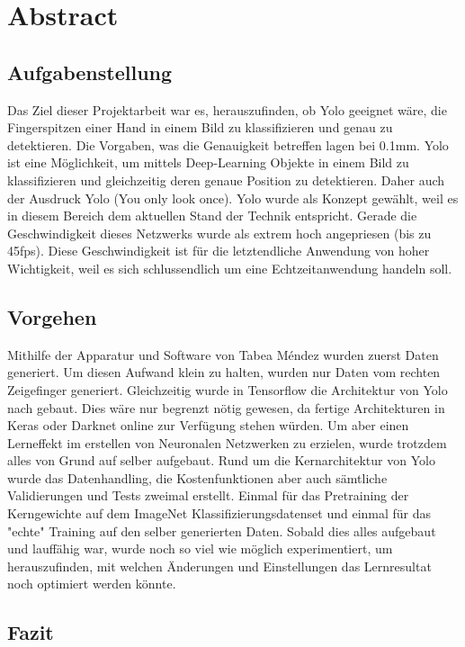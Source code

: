 \newpage
\section*{Abstract}
\subsection*{Aufgabenstellung}
Das Ziel dieser Projektarbeit war es, herauszufinden, ob Yolo geeignet wäre, die Fingerspitzen einer Hand in einem Bild zu klassifizieren und genau zu detektieren. 
Die Vorgaben, was die Genauigkeit betreffen lagen bei 0.1mm.
Yolo ist eine Möglichkeit, um mittels Deep-Learning Objekte in einem Bild zu klassifizieren und gleichzeitig deren genaue Position zu detektieren. 
Daher auch der Ausdruck Yolo (You only look once).
Yolo wurde als Konzept gewählt, weil es in diesem Bereich dem aktuellen Stand der Technik entspricht. 
Gerade die Geschwindigkeit dieses Netzwerks wurde als extrem hoch angepriesen (bis zu 45fps).
Diese Geschwindigkeit ist für die letztendliche Anwendung von hoher Wichtigkeit, weil es sich schlussendlich um eine Echtzeitanwendung handeln soll. 

\subsection*{Vorgehen}
Mithilfe der Apparatur und Software von Tabea Méndez wurden zuerst Daten generiert. 
Um diesen Aufwand klein zu halten, wurden nur Daten vom rechten Zeigefinger generiert. 
Gleichzeitig wurde in Tensorflow die Architektur von Yolo nach gebaut. 
Dies wäre nur begrenzt nötig gewesen, da fertige Architekturen in Keras oder Darknet online zur Verfügung stehen würden. 
Um aber einen Lerneffekt im erstellen von Neuronalen Netzwerken zu erzielen, wurde trotzdem alles von Grund auf selber aufgebaut. 
Rund um die Kernarchitektur von Yolo wurde das Datenhandling, die Kostenfunktionen aber auch sämtliche Validierungen und Tests zweimal erstellt.  
Einmal für das Pretraining der Kerngewichte auf dem ImageNet Klassifizierungsdatenset und einmal für das "echte" Training auf den selber generierten Daten. 
Sobald dies alles aufgebaut und lauffähig war, wurde noch so viel wie möglich experimentiert, um herauszufinden, mit welchen Änderungen und Einstellungen das Lernresultat noch optimiert werden könnte.    

\subsection*{Fazit}

